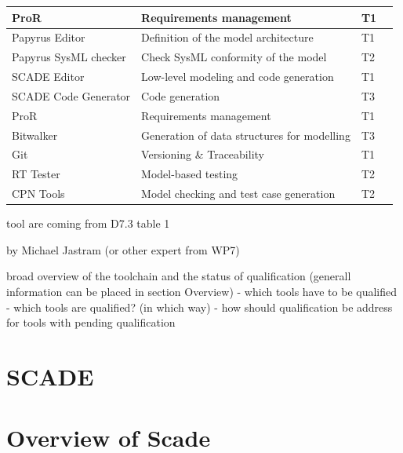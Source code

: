 \documentclass{template/openetcs_report}
\begin{document}
\begin{center}
\label{tab:ToolCat}
\tablelasttail{\hline}

\begin{supertabular}[H]{|p{2cm}|p{4cm}|p{4cm}|p{4cm}|}
\hline ProR & Requirements management & T1 & \\


\hline Papyrus Editor & Definition of the model architecture & T1 & \\
\hline Papyrus SysML checker & Check SysML conformity of the model & T2 & \\
\hline SCADE Editor & Low-level modeling and code generation & T1 & \\
\hline SCADE Code Generator & Code generation & T3 & \\
\hline ProR & Requirements management & T1 & \\
\hline Bitwalker & Generation of data structures for modelling & T3 & \\
\hline Git & Versioning \& Traceability & T1 & \\
\hline RT Tester & Model-based testing & T2 & \\ 
\hline CPN Tools & Model checking and test case generation & T2 & \\
\end{supertabular} 
\end{center}

tool are coming from D7.3 table 1





by Michael Jastram (or other expert from WP7)


broad overview of the toolchain and the status of qualification (generall information can be placed in section Overview)
- which tools have to be qualified
- which tools are qualified? (in which way)
- how should qualification be address for tools with pending qualification

\section{SCADE}

\section{Overview of Scade}
\end{document}
